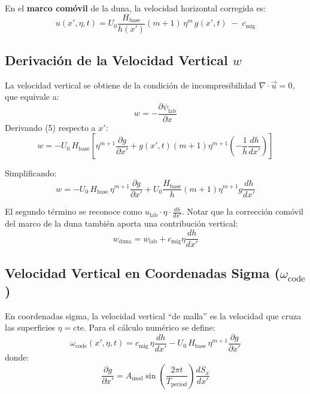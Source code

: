 \documentclass[11pt,a4paper]{article}
\begin{document}
En el \textbf{marco comóvil} de la duna, la velocidad horizontal corregida es:
\begin{equation}
    \boxed{u(x', \eta, t) = U_0 \frac{H_{\text{base}}}{h(x')} (m+1) \, \eta^m \, g(x', t) \; - \; c_{\text{mig}}}
\end{equation}

\subsection{Derivación de la Velocidad Vertical $w$}
La velocidad vertical se obtiene de la condición de incompresibilidad $\nabla \cdot \vec{u} = 0$, que equivale a:
\begin{equation}
    w = -\frac{\partial \psi_{\text{lab}}}{\partial x}
\end{equation}
Derivando (5) respecto a $x'$:
\begin{equation}
    w = -U_0 \, H_{\text{base}} \left[ \eta^{m+1} \frac{\partial g}{\partial x'} + g(x',t) (m+1) \eta^{m+1} \left( -\frac{1}{h} \frac{dh}{dx'} \right) \right]
\end{equation}

Simplificando:
\begin{equation}
    w = -U_0 \, H_{\text{base}} \, \eta^{m+1} \frac{\partial g}{\partial x'} + U_0 \frac{H_{\text{base}}}{h} (m+1) \eta^{m+1} g \frac{dh}{dx'}
\end{equation}

El segundo término se reconoce como $u_{\text{lab}} \cdot \eta \cdot \frac{dh}{dx'}$. Notar que la corrección comóvil del marco de la duna también aporta una contribución vertical:
\begin{equation}
    w_{\text{duna}} = w_{\text{lab}} + c_{\text{mig}} \eta \frac{dh}{dx'}
\end{equation}

\subsection{Velocidad Vertical en Coordenadas Sigma ($\omega_{\text{code}}$)}
En coordenadas sigma, la velocidad vertical ``de malla'' es la velocidad que cruza las superficies $\eta = \text{cte}$. Para el cálculo numérico se define:
\begin{equation}
    \omega_{\text{code}}(x', \eta, t) = c_{\text{mig}} \, \eta \frac{dh}{dx'} - U_0 \, H_{\text{base}} \, \eta^{m+1} \frac{\partial g}{\partial x'}
\end{equation}
donde:
\begin{equation}
    \frac{\partial g}{\partial x'} = A_{\text{mod}} \sin\!\left(\frac{2\pi t}{T_{\text{period}}}\right) \frac{dS_x}{dx'}
\end{equation}
\end{document}

